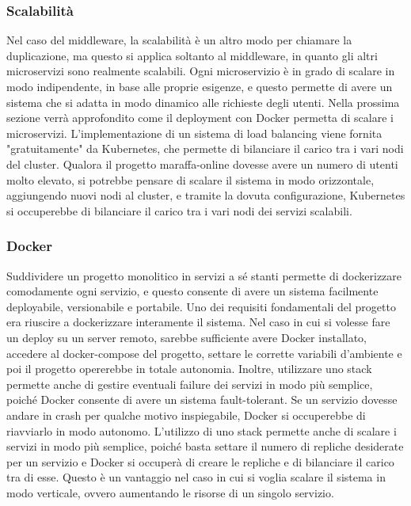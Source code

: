 \subsubsection{Scalabilità}

Nel caso del middleware, la scalabilità è un altro modo per chiamare la duplicazione, ma questo si applica soltanto al middleware, in quanto gli altri microservizi sono realmente scalabili.
Ogni microservizio è in grado di scalare in modo indipendente, in base alle proprie esigenze, e questo permette di avere un sistema che si adatta in modo dinamico alle richieste degli utenti. 
Nella prossima sezione verrà approfondito come il deployment con Docker permetta di scalare i microservizi. L'implementazione di un sistema di load balancing viene fornita
"gratuitamente" da Kubernetes, che permette di bilanciare il carico tra i vari nodi del cluster. 
Qualora il progetto maraffa-online dovesse avere un numero di utenti molto elevato, si potrebbe pensare di scalare il sistema in modo orizzontale, aggiungendo nuovi nodi al cluster, 
e tramite la dovuta configurazione, Kubernetes si occuperebbe di bilanciare il carico tra i vari nodi dei servizi scalabili. 


\subsubsection{Docker}

Suddividere un progetto monolitico in servizi a sé stanti permette di dockerizzare comodamente ogni servizio, e questo consente di avere un sistema facilmente deployabile, versionabile e portabile.
Uno dei requisiti fondamentali del progetto era riuscire a dockerizzare interamente il sistema. Nel caso in cui si volesse fare un deploy su un server remoto, sarebbe sufficiente avere Docker installato, accedere al docker-compose del progetto, settare le corrette variabili d'ambiente e poi il progetto opererebbe in totale autonomia.
Inoltre, utilizzare uno stack permette anche di gestire eventuali failure dei servizi in modo più semplice, poiché Docker consente di avere un sistema fault-tolerant. Se un servizio dovesse andare in crash per qualche motivo inspiegabile, Docker si occuperebbe di riavviarlo in modo autonomo.
L'utilizzo di uno stack permette anche di scalare i servizi in modo più semplice, poiché basta settare il numero di repliche desiderate per un servizio e Docker si occuperà di creare le repliche e di bilanciare il carico tra di esse. Questo è un vantaggio nel caso in cui si voglia scalare il sistema in modo verticale, ovvero aumentando le risorse di un singolo servizio.



